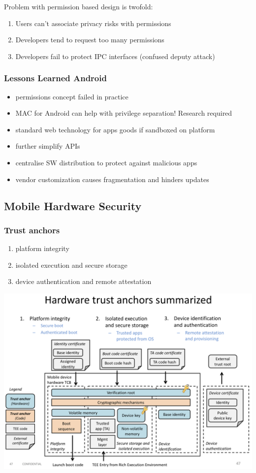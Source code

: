 Problem with permission based design is twofold:
\begin{enumerate}
    \item Users can't associate privacy risks with permissions
    \item Developers tend to request too many permissions
    \item Developers fail to protect IPC interfaces (confused deputy attack)
\end{enumerate}

\subsubsection{Lessons Learned Android}
\begin{itemize}
    \item permissions concept failed in practice
    \item MAC for Android can help with privilege separation! Research required
    \item standard web technology for apps goods if sandboxed on platform
    \item further simplify APIs
    \item centralise SW distribution to protect against malicious apps
    \item vendor customization causes fragmentation and hinders updates
\end{itemize}

\subsection{Mobile Hardware Security}
\subsubsection{Trust anchors}
\begin{enumerate}
    \item platform integrity
    \item isolated execution and secure storage
    \item device authentication and remote attestation
\end{enumerate}

\begin{center}
    \includegraphics[width=0.85\linewidth]{images/mobile_sec_HardwareTrustAnchors.png}
\end{center}

